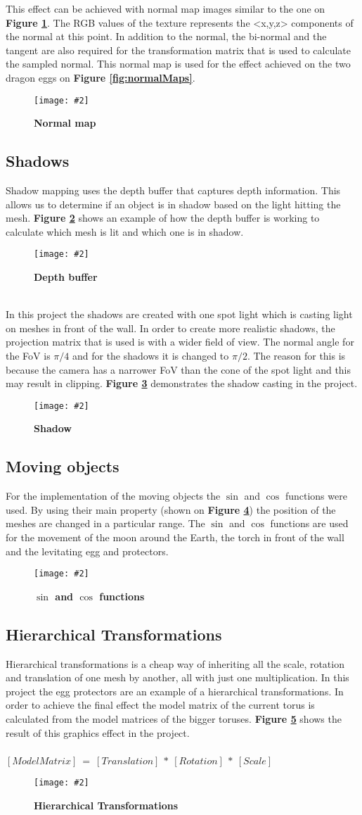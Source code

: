 \documentclass[10pt, a4paper]{article}
\newcommand{\figuremacro}[5]{
    \begin{figure}[#1]
        \centering
        \texttt{[image: \#2]}
        \caption[#3]{\textbf{#3}#4}
        \label{fig:#2}
    \end{figure}
}
\begin{document}
   	This effect can be achieved with normal map images similar to the one on \textbf{Figure {\ref{fig:bublenormalmap}}}. The RGB values of the texture represents the <x,y,z> components of the normal at this point. In addition to the normal, the bi-normal and the tangent are also required for the transformation matrix that is used to calculate the sampled normal. This normal map is used for the effect achieved on the two dragon eggs on \textbf{Figure {\ref{fig:normalMaps}}}.
	\figuremacro{h}{bublenormalmap}{Normal map}{ }{0.8}	
	   	
	\subsection{Shadows}
	Shadow mapping uses the depth buffer that captures depth information. This allows us to determine if an object is in shadow based on the light hitting the mesh. \textbf{Figure {\ref{fig:shadowExpl}}} shows an example of how the depth buffer is working to calculate which mesh is lit and which one is in shadow. 
	\figuremacro{h}{shadowExpl}{Depth buffer}{ }{1.0}	
	\\In this project the shadows are created with one spot light which is casting light on meshes in front of the wall. In order to create more realistic shadows, the projection matrix that is used is with a wider field of view. The normal angle for the FoV is $\pi/4$ and for the shadows it is changed to $\pi/2$. The reason for this is because the camera has a narrower FoV than the cone of the spot light and this may result in clipping. \textbf{Figure {\ref{fig:shadowStick}}} demonstrates the shadow casting in the project. 
	\figuremacro{h}{shadowStick}{Shadow}{ }{0.9}

	
	\subsection{Moving objects}
	For the implementation of the moving objects the $\sin$ and $\cos$ functions were used. By using their main property (shown on \textbf{Figure {\ref{fig:sincos}}}) the position of the meshes are changed in a particular range. The $\sin$ and $\cos$ functions are used for the movement of the moon around the Earth, the torch in front of the wall and the levitating egg and protectors.	
	\figuremacro{h}{sincos}{$\sin$ and $\cos$ functions}{ }{0.9}
	\subsection{Hierarchical Transformations}
	Hierarchical transformations is a cheap way of inheriting all the scale, rotation and translation of one mesh by another, all with just one multiplication. In this project the egg protectors are an example of a hierarchical transformations. In order to achieve the final effect the model matrix of the current torus is calculated from the model matrices of the bigger toruses. \textbf{Figure {\ref{fig:hierarchicalTransformations}}} shows the result of this graphics effect in the project.
	\\\\
	$[ModelMatrix]~=~[Translation]~*~[Rotation]~*~[Scale]$~
	\figuremacro{h}{hierarchicalTransformations}{Hierarchical Transformations}{ }{0.8}
\end{document}
